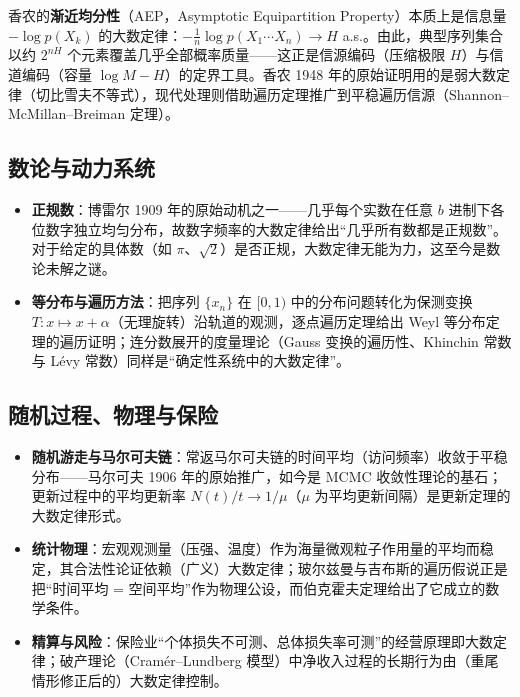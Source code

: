 香农的\textbf{渐近均分性}（AEP，Asymptotic Equipartition Property）本质上是信息量 $-\log p(X_k)$ 的大数定律：$-\frac{1}{n}\log p(X_1 \cdots X_n) \to H$ a.s.。由此，典型序列集合以约 $2^{nH}$ 个元素覆盖几乎全部概率质量——这正是信源编码（压缩极限 $H$）与信道编码（容量 $\log M - H$）的定界工具。香农 1948 年的原始证明用的是弱大数定律（切比雪夫不等式），现代处理则借助遍历定理推广到平稳遍历信源（Shannon--McMillan--Breiman 定理）。

\subsection{数论与动力系统}

\begin{itemize}
    \item \textbf{正规数}：博雷尔 1909 年的原始动机之一——几乎每个实数在任意 $b$ 进制下各位数字独立均匀分布，故数字频率的大数定律给出“几乎所有数都是正规数”\cite{borel1909}。对于给定的具体数（如 $\pi$、$\sqrt{2}$）是否正规，大数定律无能为力，这至今是数论未解之谜。
    \item \textbf{等分布与遍历方法}：把序列 $\{x_n\}$ 在 $[0,1)$ 中的分布问题转化为保测变换 $T: x \mapsto x + \alpha$（无理旋转）沿轨道的观测，逐点遍历定理给出 Weyl 等分布定理的遍历证明；连分数展开的度量理论（Gauss 变换的遍历性、Khinchin 常数与 L\'evy 常数）同样是“确定性系统中的大数定律”。
\end{itemize}

\subsection{随机过程、物理与保险}

\begin{itemize}
    \item \textbf{随机游走与马尔可夫链}：常返马尔可夫链的时间平均（访问频率）收敛于平稳分布——马尔可夫 1906 年的原始推广\cite{markov1906}，如今是 MCMC 收敛性理论的基石；更新过程中的平均更新率 $N(t)/t \to 1/\mu$（$\mu$ 为平均更新间隔）是更新定理的大数定律形式。
    \item \textbf{统计物理}：宏观观测量（压强、温度）作为海量微观粒子作用量的平均而稳定，其合法性论证依赖（广义）大数定律；玻尔兹曼与吉布斯的遍历假说正是把“时间平均 = 空间平均”作为物理公设，而伯克霍夫定理\cite{birkhoff1931}给出了它成立的数学条件。
    \item \textbf{精算与风险}：保险业“个体损失不可测、总体损失率可测”的经营原理即大数定律；破产理论（Cram\'er--Lundberg 模型）中净收入过程的长期行为由（重尾情形修正后的）大数定律控制。
\end{itemize}

